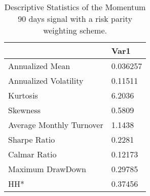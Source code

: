 \begin{table}[H]
\centering
\begin{tabular}{ll}
\hline& Var1 \\ 
\hline 
Annualized Mean & 0.036257 \\ 
Annualized Volatility & 0.11511 \\ 
Kurtosis & 6.2036 \\ 
Skewness & 0.5809 \\ 
Average Monthly Turnover & 1.1438 \\ 
Sharpe Ratio & 0.2281 \\ 
Calmar Ratio & 0.12173 \\ 
Maximum DrawDown & 0.29785 \\ 
HH* & 0.37456 \\ 
\hline
\end{tabular}
\caption{Descriptive Statistics of the Momentum 90 days signal with a risk parity weighting scheme.}
\label{MOM90RP}
\end{table}